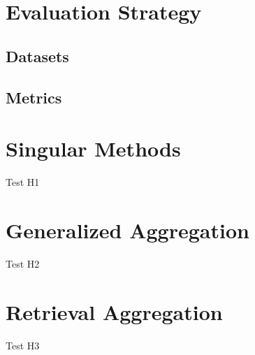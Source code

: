 \label{chap:results}

\section{Evaluation Strategy}
\subsection{Datasets}
\subsection{Metrics}

\section{Singular Methods}

Test H1


\section{Generalized Aggregation}

Test H2


\section{Retrieval Aggregation}

Test H3




